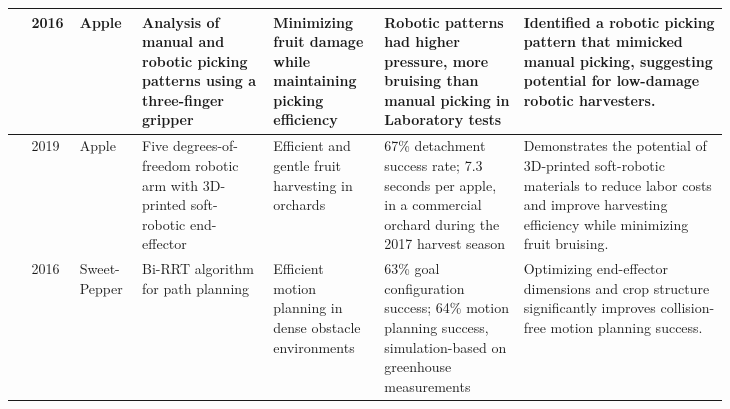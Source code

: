 \documentclass[a4paper,fleqn]{cas-dc}
\begin{document}
\begin{table}
\begin{tabular}{p{0.025\linewidth} p{0.025\linewidth} p{0.055\linewidth} p{0.16\linewidth} p{0.135\linewidth} p{0.175\linewidth} p{0.255\linewidth}}
\cite{li2016characterizing} & 2016 & Apple & Analysis of manual and robotic picking patterns using a three-finger gripper & Minimizing fruit damage while maintaining picking efficiency & Robotic patterns had higher pressure, more bruising than manual picking in Laboratory tests  & Identified a robotic picking pattern that mimicked manual picking, suggesting potential for low-damage robotic harvesters. \\  \midrule
\cite{hohimer2019design} & 2019 & Apple & Five degrees-of-freedom robotic arm with 3D-printed soft-robotic end-effector & Efficient and gentle fruit harvesting in orchards & 67\% detachment success rate; 7.3 seconds per apple, in a commercial orchard during the 2017 harvest season & Demonstrates the potential of 3D-printed soft-robotic materials to reduce labor costs and improve harvesting efficiency while minimizing fruit bruising. \\ \midrule
\cite{bac2016analysis} & 2016 & Sweet-Pepper & Bi-RRT algorithm for path planning & Efficient motion planning in dense obstacle environments & 63\% goal configuration success; 64\% motion planning success, simulation-based on greenhouse measurements & Optimizing end-effector dimensions and crop structure significantly improves collision-free motion planning success. \\ 
\bottomrule
\end{tabular}
\end{table}
\end{document}
